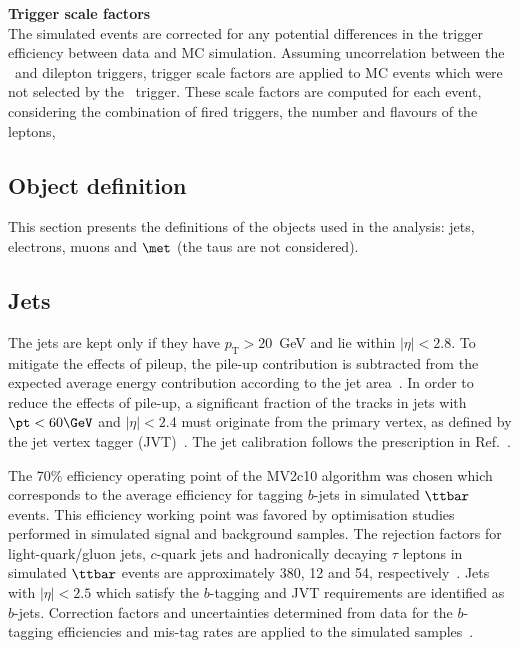 \par{\bfseries Trigger scale factors\\}
The simulated events are corrected for any potential differences in 
the trigger efficiency between data and MC simulation.
Assuming uncorrelation between the \met\ and dilepton triggers, 
trigger scale factors are applied to MC events which were not selected 
by the \met\ trigger.
These scale factors are computed for each event, considering the combination of fired triggers, the number and flavours of the leptons, 

\subsection{Object definition}
\label{subsec:strategy.sel.obj}

This section presents the definitions of the objects used in the analysis: 
jets, electrons, muons and $\met$ (the taus are not considered).

\subsection*{Jets}
\label{subsec:sec.strategy.sel.objects_jets}



The jets are kept only if they have $p_\mathrm{T}>20$~GeV and lie 
within $|\eta|<2.8$. 
To mitigate the effects of pileup, the pile-up contribution is subtracted 
from the expected average energy contribution according to the jet area~\cite{Cacciari:2007fd,Aaboud:2017jcu}.
In order to reduce the effects of pile-up, 
a significant fraction of the tracks in jets with $\pt<60 \GeV$ and $|\eta|<2.4$ must originate from the primary vertex, 
as defined by the jet vertex tagger (JVT)~\cite{ATLAS-CONF-2014-018}. 
The jet calibration follows the prescription in Ref.~\cite{Aaboud:2017jcu}.

 
The 70\% efficiency operating point of the MV2c10 algorithm  was chosen which 
corresponds to the
average efficiency for tagging $b$-jets in simulated $\ttbar$ events. 
This efficiency working point was favored by optimisation studies performed in 
simulated signal and background samples.
The rejection factors for light-quark/gluon jets, $c$-quark jets and hadronically decaying $\tau$ leptons in simulated $\ttbar$ events 
are approximately 380, 12 and 54, respectively~\cite{ATL-PHYS-PUB-2015-022,ATL-PHYS-PUB-2016-012}. 
Jets with $|\eta|<2.5$ which satisfy the $b$-tagging and JVT requirements are identified as $b$-jets. 
Correction factors and uncertainties determined from data for the $b$-tagging efficiencies and mis-tag rates
are applied to the simulated samples~\cite{ATL-PHYS-PUB-2015-022}. 


